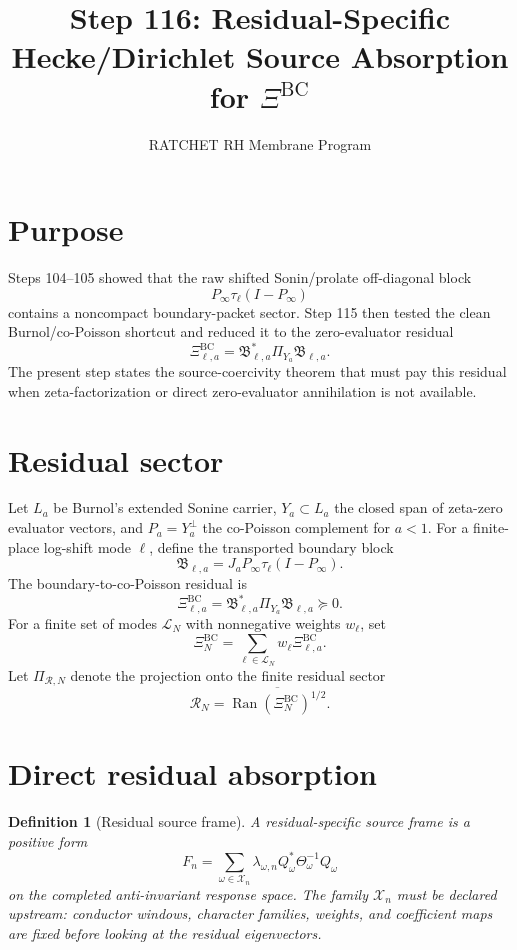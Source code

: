 \documentclass[11pt]{article}
\title{Step 116: Residual-Specific Hecke/Dirichlet Source Absorption for $\Xi^{\mathrm{BC}}$}
\author{RATCHET RH Membrane Program}
\date{}
\newtheorem{definition}{Definition}
\newcommand{\XiBC}{\Xi^{\mathrm{BC}}}
\newcommand{\Ran}{\operatorname{Ran}}
\begin{document}
\maketitle

\section{Purpose}
Steps 104--105 showed that the raw shifted Sonin/prolate off-diagonal block
\[
P_\infty\tau_\ell(I-P_\infty)
\]
contains a noncompact boundary-packet sector. Step 115 then tested the clean
Burnol/co-Poisson shortcut and reduced it to the zero-evaluator residual
\[
\XiBC_{\ell,a}=\mathfrak B_{\ell,a}^*\Pi_{Y_a}\mathfrak B_{\ell,a}.
\]
The present step states the source-coercivity theorem that must pay this residual
when zeta-factorization or direct zero-evaluator annihilation is not available.

\section{Residual sector}
Let $L_a$ be Burnol's extended Sonine carrier, $Y_a\subset L_a$ the closed span of
zeta-zero evaluator vectors, and $P_a=Y_a^\perp$ the co-Poisson complement for
$a<1$. For a finite-place log-shift mode $\ell$, define the transported boundary block
\[
\mathfrak B_{\ell,a}=J_aP_\infty\tau_\ell(I-P_\infty).
\]
The boundary-to-co-Poisson residual is
\[
\boxed{\XiBC_{\ell,a}=\mathfrak B_{\ell,a}^*\Pi_{Y_a}\mathfrak B_{\ell,a}\succeq0.}
\]
For a finite set of modes $\mathcal L_N$ with nonnegative weights $w_\ell$, set
\[
\XiBC_N=\sum_{\ell\in\mathcal L_N}w_\ell\XiBC_{\ell,a}.
\]
Let $\Pi_{\mathcal R,N}$ denote the projection onto the finite residual sector
\[
\mathcal R_N=\overline{\Ran(\XiBC_N)^{1/2}}.
\]

\section{Direct residual absorption}
\begin{definition}[Residual source frame]
A residual-specific source frame is a positive form
\[
F_n=\sum_{\omega\in\mathcal X_n}\lambda_{\omega,n}Q_\omega^*\Theta_\omega^{-1}Q_\omega
\]
on the completed anti-invariant response space. The family $\mathcal X_n$ must be
declared upstream: conductor windows, character families, weights, and coefficient
maps are fixed before looking at the residual eigenvectors.
\end{definition}
\end{document}
